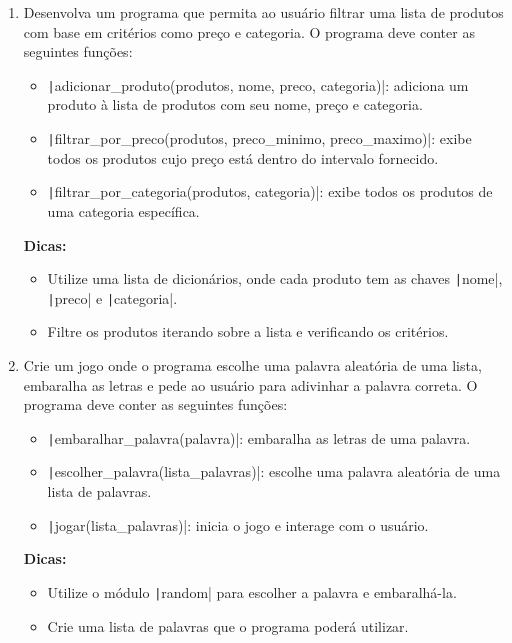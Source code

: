 \documentclass[12pt]{article}
\begin{document}
\begin{enumerate}
  \item Desenvolva um programa que permita ao usuário filtrar uma lista de produtos com base em critérios como preço e categoria. O programa deve conter as seguintes funções:
    \begin{itemize}
      \item \texttt|adicionar_produto(produtos, nome, preco, categoria)|: adiciona um produto à lista de produtos com seu nome, preço e categoria.
      \item \texttt|filtrar_por_preco(produtos, preco_minimo, preco_maximo)|: exibe todos os produtos cujo preço está dentro do intervalo fornecido.
      \item \texttt|filtrar_por_categoria(produtos, categoria)|: exibe todos os produtos de uma categoria específica.
    \end{itemize}
    \textbf{Dicas:}
    \begin{itemize}
      \item Utilize uma lista de dicionários, onde cada produto tem as chaves \texttt|nome|, \texttt|preco| e \texttt|categoria|.
      \item Filtre os produtos iterando sobre a lista e verificando os critérios.
    \end{itemize}

  \item Crie um jogo onde o programa escolhe uma palavra aleatória de uma lista, embaralha as letras e pede ao usuário para adivinhar a palavra correta. O programa deve conter as seguintes funções:
    \begin{itemize}
      \item \texttt|embaralhar_palavra(palavra)|: embaralha as letras de uma palavra.
      \item \texttt|escolher_palavra(lista_palavras)|: escolhe uma palavra aleatória de uma lista de palavras.
      \item \texttt|jogar(lista_palavras)|: inicia o jogo e interage com o usuário.
    \end{itemize}
    \textbf{Dicas:}
    \begin{itemize}
      \item Utilize o módulo \texttt|random| para escolher a palavra e embaralhá-la.
      \item Crie uma lista de palavras que o programa poderá utilizar.
    \end{itemize}

    \newpage


\end{enumerate}
\end{document}
